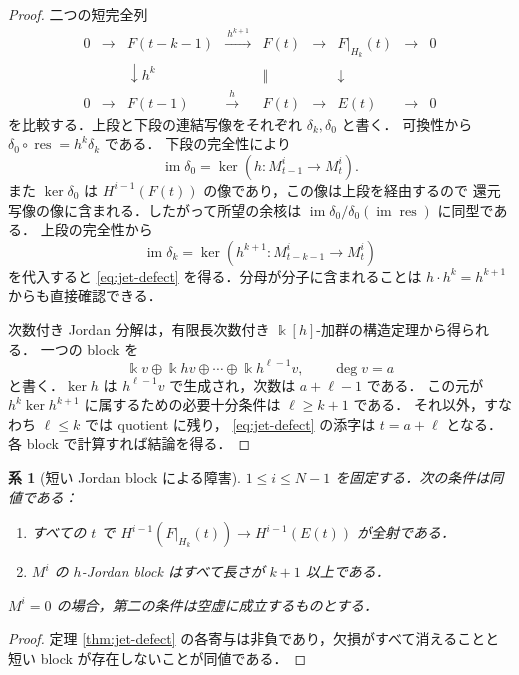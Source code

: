 \documentclass[a4paper,11pt]{ltjsarticle}
\numberwithin{equation}{section}
\theoremstyle{plain}
\newtheorem{corollary}[theorem]{系}
\theoremstyle{definition}
\theoremstyle{remark}
\begin{document}
\begin{proof}
二つの短完全列
\[
\begin{array}{ccccccccc}
0&\longrightarrow&F(t-k-1)&\xrightarrow{\ h^{k+1}\ }&F(t)
 &\longrightarrow&F|_{H_k}(t)&\longrightarrow&0\\
 &&\downarrow h^k&&\Vert&&\downarrow&&\\
0&\longrightarrow&F(t-1)&\xrightarrow{\ h\ }&F(t)
 &\longrightarrow&E(t)&\longrightarrow&0
\end{array}
\]
を比較する．上段と下段の連結写像をそれぞれ $\delta_k,\delta_0$ と書く．
可換性から $\delta_0\circ\operatorname{res}=h^k\delta_k$ である．
下段の完全性により
\[
 \operatorname{im}\delta_0=\ker(h:M^i_{t-1}\to M^i_t).
\]
また $\ker\delta_0$ は $H^{i-1}(F(t))$ の像であり，この像は上段を経由するので
還元写像の像に含まれる．したがって所望の余核は
$\operatorname{im}\delta_0/\delta_0(\operatorname{im}\operatorname{res})$ に同型である．
上段の完全性から
\[
 \operatorname{im}\delta_k=
 \ker(h^{k+1}:M^i_{t-k-1}\to M^i_t)
\]
を代入すると \eqref{eq:jet-defect} を得る．分母が分子に含まれることは
$h\cdot h^k=h^{k+1}$ からも直接確認できる．

次数付き Jordan 分解は，有限長次数付き $\Bbbk[h]$-加群の構造定理から得られる．
一つの block を
\[
 \Bbbk v\oplus\Bbbk hv\oplus\cdots\oplus\Bbbk h^{\ell-1}v,
 \qquad\deg v=a
\]
と書く．$\ker h$ は $h^{\ell-1}v$ で生成され，次数は $a+\ell-1$ である．
この元が $h^k\ker h^{k+1}$ に属するための必要十分条件は $\ell\geq k+1$ である．
それ以外，すなわち $\ell\leq k$ では quotient に残り，
\eqref{eq:jet-defect} の添字は $t=a+\ell$ となる．各 block で計算すれば結論を得る．
\end{proof}

\begin{corollary}[短い Jordan block による障害]\label{cor:short-block}
$1\leq i\leq N-1$ を固定する．次の条件は同値である：
\begin{enumerate}
\item すべての $t$ で $H^{i-1}(F|_{H_k}(t))\to H^{i-1}(E(t))$ が全射である．
\item $M^i$ の $h$-Jordan block はすべて長さが $k+1$ 以上である．
\end{enumerate}
$M^i=0$ の場合，第二の条件は空虚に成立するものとする．
\end{corollary}

\begin{proof}
定理 \ref{thm:jet-defect} の各寄与は非負であり，欠損がすべて消えることと
短い block が存在しないことが同値である．
\end{proof}
\end{document}
